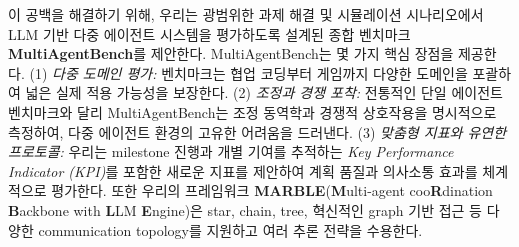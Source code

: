

이 공백을 해결하기 위해, 우리는 광범위한 과제 해결 및 시뮬레이션 시나리오에서 LLM 기반 다중 에이전트 시스템을 평가하도록 설계된 종합 벤치마크 \textbf{MultiAgentBench}를 제안한다. MultiAgentBench는 몇 가지 핵심 장점을 제공한다. (1) \textit{다중 도메인 평가:} 벤치마크는 협업 코딩부터 게임까지 다양한 도메인을 포괄하여 넓은 실제 적용 가능성을 보장한다. (2) \textit{조정과 경쟁 포착:} 전통적인 단일 에이전트 벤치마크와 달리 MultiAgentBench는 조정 동역학과 경쟁적 상호작용을 명시적으로 측정하여, 다중 에이전트 환경의 고유한 어려움을 드러낸다. (3) \textit{맞춤형 지표와 유연한 프로토콜:} 우리는 milestone 진행과 개별 기여를 추적하는 \textit{Key Performance Indicator (KPI)}를 포함한 새로운 지표를 제안하여 계획 품질과 의사소통 효과를 체계적으로 평가한다. 또한 우리의 프레임워크 \textbf{MARBLE}(\textbf{M}ulti-agent coo\textbf{R}dination \textbf{B}ackbone with \textbf{L}LM \textbf{E}ngine)은 star, chain, tree, 혁신적인 graph 기반 접근 등 다양한 communication topology를 지원하고 여러 추론 전략을 수용한다.

